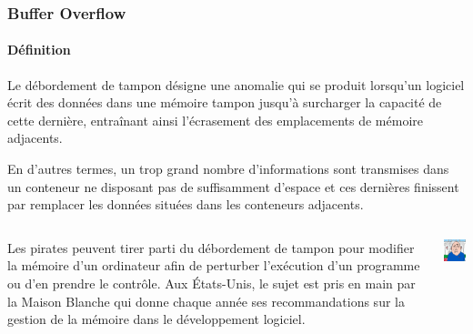 \documentclass{beamer}
\begin{document}
    \begin{frame}[fragile]
        \frametitle{Buffer Overflow}
        \framesubtitle{Définition}
        \transdissolve
        \begin{footnotesize}
            Le débordement de tampon désigne une anomalie qui se produit lorsqu'un logiciel écrit des données dans une mémoire tampon jusqu'à surcharger la capacité de cette dernière, entraînant ainsi l'écrasement des emplacements de mémoire adjacents.

            En d'autres termes, un trop grand nombre d'informations sont transmises dans un conteneur ne disposant pas de suffisamment d'espace et ces dernières finissent par remplacer les données situées dans les conteneurs adjacents.
            \begin{columns}
                \begin{column}{0.7\textwidth}
                    Les pirates peuvent tirer parti du débordement de tampon pour modifier la mémoire d'un ordinateur afin de perturber l'exécution d'un programme ou d'en prendre le contrôle\footnotemark.
                    \bigbreak
                    Aux États-Unis, le sujet est pris en main par la Maison Blanche qui donne chaque année ses recommandations sur la gestion de la mémoire dans le développement logiciel\footnotemark.
                \end{column}
                \begin{column}{0.3\textwidth}
                    \includegraphics[width=3cm]{image/old-senile-at-white-house}
                \end{column}
            \end{columns}
        \end{footnotesize}
    \end{frame}
\end{document}
